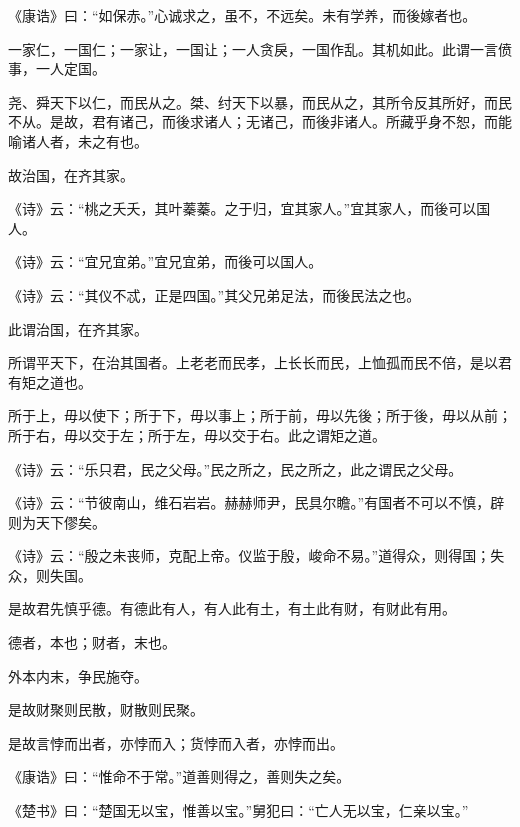 \documentclass[twoside,openany]{book}
\begin{document}
\begin{pinyinscope}
《康诰》曰：“如保赤。”心诚求之，虽不，不远矣。未有学养，而後嫁者也。

一家仁，一国仁；一家让，一国让；一人贪戾，一国作乱。其机如此。此谓一言偾事，一人定国。

尧、舜天下以仁，而民从之。桀、纣天下以暴，而民从之，其所令反其所好，而民不从。是故，君有诸己，而後求诸人；无诸己，而後非诸人。所藏乎身不恕，而能喻诸人者，未之有也。

故治国，在齐其家。

《诗》云：“桃之夭夭，其叶蓁蓁。之于归，宜其家人。”宜其家人，而後可以国人。

《诗》云：“宜兄宜弟。”宜兄宜弟，而後可以国人。

《诗》云：“其仪不忒，正是四国。”其父兄弟足法，而後民法之也。

此谓治国，在齐其家。

所谓平天下，在治其国者。上老老而民孝，上长长而民，上恤孤而民不倍，是以君有矩之道也。

所于上，毋以使下；所于下，毋以事上；所于前，毋以先後；所于後，毋以从前；所于右，毋以交于左；所于左，毋以交于右。此之谓矩之道。

《诗》云：“乐只君，民之父母。”民之所之，民之所之，此之谓民之父母。

《诗》云：“节彼南山，维石岩岩。赫赫师尹，民具尔瞻。”有国者不可以不慎，辟则为天下僇矣。

《诗》云：“殷之未丧师，克配上帝。仪监于殷，峻命不易。”道得众，则得国；失众，则失国。

是故君先慎乎德。有德此有人，有人此有土，有土此有财，有财此有用。

德者，本也；财者，末也。

外本内末，争民施夺。

是故财聚则民散，财散则民聚。

是故言悖而出者，亦悖而入；货悖而入者，亦悖而出。

《康诰》曰：“惟命不于常。”道善则得之，善则失之矣。

《楚书》曰：“楚国无以宝，惟善以宝。”舅犯曰：“亡人无以宝，仁亲以宝。”


\end{pinyinscope}
\end{document}
